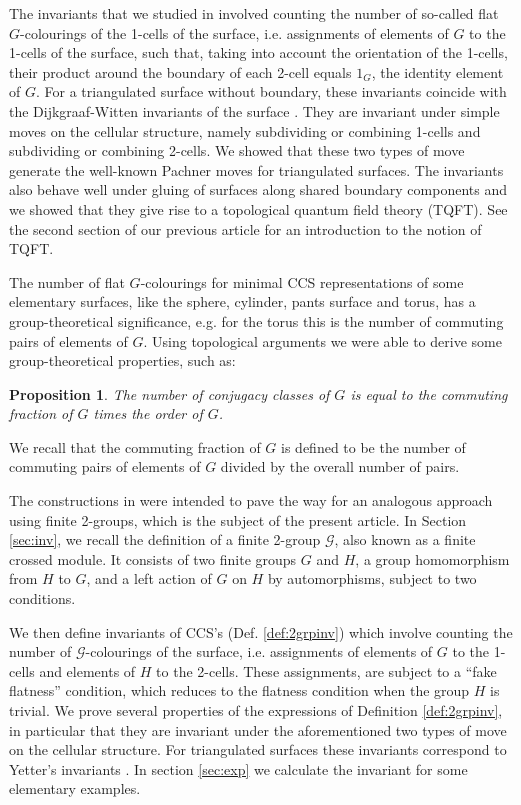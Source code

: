 \documentclass[a4paper,11pt]{article}
\newtheorem{Proposition}[Theorem]{Proposition}
\def \G {\mathcal{G}}
\begin{document}
The invariants that we studied in \cite{bp1} involved counting the number of so-called flat $G$-colourings of the 1-cells of the surface, i.e. assignments of elements of $G$ to the 1-cells of the surface, such that, taking into account the orientation of the 1-cells, their product around the boundary of each 2-cell equals $1_G$, the identity element of $G$. For a triangulated surface without boundary, these invariants coincide with the Dijkgraaf-Witten invariants of the surface \cite{dw}. They are invariant under simple moves on the cellular structure, namely subdividing or combining 1-cells and subdividing or combining 2-cells. We showed that these two types of move generate the well-known Pachner moves for triangulated surfaces. The invariants also behave well under gluing of surfaces along shared boundary components and we showed that they give rise to a topological quantum field theory (TQFT). See the second section of our previous article \cite{bp1} for an introduction to the notion of TQFT.

The number of flat $G$-colourings for minimal CCS representations of some elementary surfaces, like the sphere, cylinder, pants surface and torus, has a group-theoretical significance, e.g. for the torus this is the number of commuting pairs of elements of $G$. Using topological arguments we were able to derive some group-theoretical properties, such as:
\begin{Proposition}
The number of conjugacy classes of $G$ is equal to the commuting fraction of $G$ times the order of $G$. 
\label{cf-prop}
\end{Proposition}
We recall that the commuting fraction of $G$ is defined to be the number of commuting pairs of elements of $G$ divided by the overall number of pairs.

The constructions in \cite{bp1} were intended to pave the way for an analogous approach using finite 2-groups, which is the subject of the present article. In Section \ref{sec:inv}, we recall the definition of a finite 2-group $\G$, also known as a finite crossed module. It consists of two finite groups $G$ and $H$, a group homomorphism from $H$ to $G$, and a left action of $G$ on $H$ by automorphisms, subject to two conditions.


We then define invariants of CCS's (Def. \ref{def:2grpinv}) which involve counting the number of $\G$-colourings of the surface, i.e. assignments of elements of $G$ to the 1-cells and elements of $H$ to the 2-cells. These assignments,  are subject to a ``fake flatness'' condition, which reduces to the flatness condition when the group $H$ is trivial. We prove several properties of the expressions of Definition \ref{def:2grpinv}, in particular that they are invariant under the aforementioned two types of move on the cellular structure. For triangulated surfaces these invariants correspond to Yetter's invariants \cite{yetter, FMPo}. In section \ref{sec:exp}  we calculate the invariant for some elementary examples. 
\end{document}
